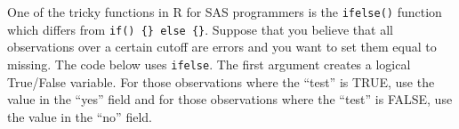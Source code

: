 \documentclass[
]{book}
\newenvironment{Shaded}{\begin{snugshade}}{\end{snugshade}}
\newcommand{\CommentTok}[1]{\textcolor[rgb]{0.56,0.35,0.01}{\textit{#1}}}
\newcommand{\DecValTok}[1]{\textcolor[rgb]{0.00,0.00,0.81}{#1}}
\newcommand{\ErrorTok}[1]{\textcolor[rgb]{0.64,0.00,0.00}{\textbf{#1}}}
\newcommand{\FloatTok}[1]{\textcolor[rgb]{0.00,0.00,0.81}{#1}}
\newcommand{\KeywordTok}[1]{\textcolor[rgb]{0.13,0.29,0.53}{\textbf{#1}}}
\newcommand{\NormalTok}[1]{#1}
\newcommand{\OperatorTok}[1]{\textcolor[rgb]{0.81,0.36,0.00}{\textbf{#1}}}
\newcommand{\StringTok}[1]{\textcolor[rgb]{0.31,0.60,0.02}{#1}}
\begin{document}
\begin{Shaded}
\end{Shaded}

One of the tricky functions in R for SAS programmers is the \texttt{ifelse()} function which differs from \texttt{if()\ \{\}\ else\ \{\}}. Suppose that you believe that all observations over a certain cutoff are errors and you want to set them equal to missing. The code below uses \texttt{ifelse}. The first argument creates a logical True/False variable. For those observations where the ``test'' is TRUE, use the value in the ``yes'' field and for those observations where the ``test'' is FALSE, use the value in the ``no'' field.

\begin{Shaded}
\end{Shaded}
\end{document}
